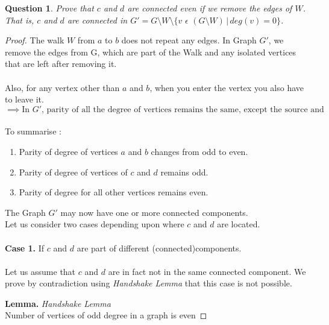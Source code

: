 \documentclass{article}
\newtheorem{question}{Question}
\begin{document}
\begin{question}
    Prove that $c$ and $d$ are connected even if we remove the edges of $W$.  That is, $c$ and $d$ are connected in $G' = G\setminus W\setminus \{v \hspace{4pt} \epsilon \hspace{4pt} (G\setminus W)\hspace{2pt} |\hspace{2pt} deg(v) = 0\}$.

\end{question}
\begin{proof}
    The walk $W$ from $a$ to $b$ does not repeat any edges. In Graph $G'$, we remove the edges from G, which are part of the Walk and any isolated vertices that are left after removing it.\\
    \\
    Also, for any vertex other than $a$ and $b$, when you enter the vertex you also have to leave it.\\
    $\implies \text{In $G'$, parity of all the degree of vertices remains the same, except the source and destination vertices.}$\\
    \\ To summarise :
    \begin{enumerate}
        \item Parity of degree of vertices $a$ and $b$ changes from odd to even.\\
        \item Parity of degree of vertices of $c$ and $d$ remains odd.\\
        \item Parity of degree for all other vertices remains even.
    \end{enumerate}
    The Graph $G'$ may now have one or more connected components.\\
    Let us consider two cases depending upon where $c$ and $d$ are located.\\
    \\ \textbf{Case 1.}
        If $c$ and $d$ are part of different (connected)components.\\
        \\
        Let us assume that $c$ and $d$ are in fact not in the same connected component. We prove by contradiction using \textit{Handshake Lemma} that this case is not possible. 
        
        \textbf{Lemma.}  \textit{Handshake Lemma}\\
            Number of vertices of odd degree in a graph is even
        

\end{proof}
\end{document}
